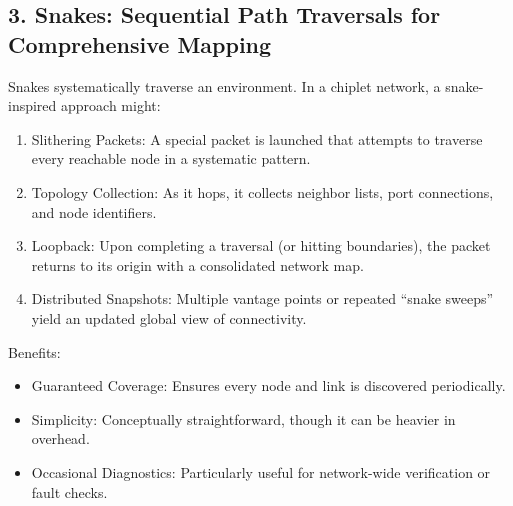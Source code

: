 \documentclass[../../../OAE-SPEC-MAIN.tex]{subfiles}
\begin{document}
\subsection{3. Snakes: Sequential Path Traversals for Comprehensive Mapping}

Snakes systematically traverse an environment. In a chiplet network, a snake-inspired approach might:
\begin{enumerate}
	\item  Slithering Packets: A special packet is launched that attempts to traverse every reachable node in a systematic pattern.
	\item  Topology Collection: As it hops, it collects neighbor lists, port connections, and node identifiers.
	\item  Loopback: Upon completing a traversal (or hitting boundaries), the packet returns to its origin with a consolidated network map.
	\item  Distributed Snapshots: Multiple vantage points or repeated “snake sweeps” yield an updated global view of connectivity.
\end{enumerate}


Benefits:
\begin{itemize}
	\item Guaranteed Coverage: Ensures every node and link is discovered periodically.
	\item Simplicity: Conceptually straightforward, though it can be heavier in overhead.
	\item Occasional Diagnostics: Particularly useful for network-wide verification or fault checks.
\end{itemize}
\end{document}
